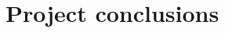 \documentclass[a4paper,11pt]{kth-mag}
\begin{document}










\chapter{Project conclusions}

%
%
%
%
%
%




\end{document}
